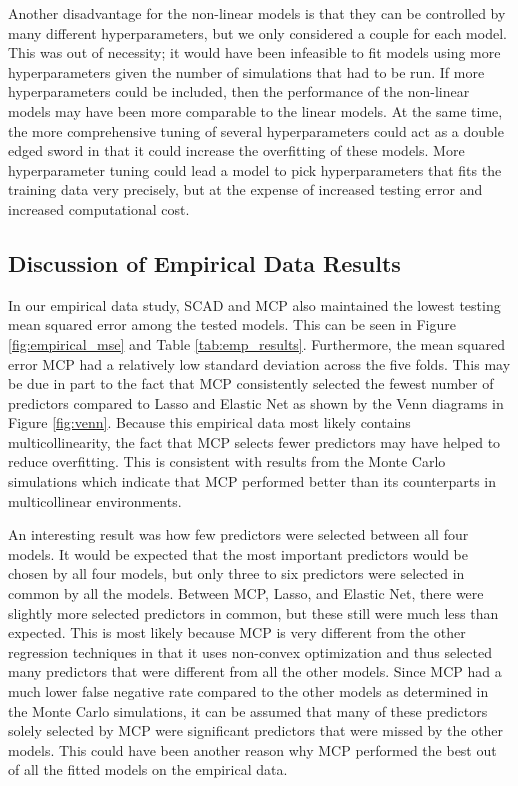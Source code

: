 \documentclass{article}
\begin{document}
Another disadvantage for the non-linear models is that they can be controlled by many different hyperparameters, but we only considered a couple for each model. This was out of necessity; it would have been infeasible to fit models using more hyperparameters given the number of simulations that had to be run. If more hyperparameters could be included, then the performance of the non-linear models may have been more comparable to the linear models. At the same time, the more comprehensive tuning of several hyperparameters could act as a double edged sword in that it could increase the overfitting of these models. More hyperparameter tuning could lead a model to pick hyperparameters that fits the training data very precisely, but at the expense of increased testing error and increased computational cost.

\subsection{Discussion of Empirical Data Results}
In our empirical data study, SCAD and MCP also maintained the lowest testing mean squared error among the tested models. This can be seen in Figure \ref{fig:empirical_mse} and Table \ref{tab:emp_results}. Furthermore, the mean squared error MCP had a relatively low standard deviation across the five folds. This may be due in part to the fact that MCP consistently selected the fewest number of predictors compared to Lasso and Elastic Net as shown by the Venn diagrams in Figure \ref{fig:venn}. Because this empirical data most likely contains multicollinearity, the fact that MCP selects fewer predictors may have helped to reduce overfitting. This is consistent with results from the Monte Carlo simulations which indicate that MCP performed better than its counterparts in multicollinear environments.

An interesting result was how few predictors were selected between all four models. It would be expected that the most important predictors would be chosen by all four models, but only three to six predictors were selected in common by all the models. Between MCP, Lasso, and Elastic Net, there were slightly more selected predictors in common, but these still were much less than expected. This is most likely because MCP is very different from the other regression techniques in that it uses non-convex optimization and thus selected many predictors that were different from all the other models. Since MCP had a much lower false negative rate compared to the other models as determined in the Monte Carlo simulations, it can be assumed that many of these predictors solely selected by MCP were significant predictors that were missed by the other models. This could have been another reason why MCP performed the best out of all the fitted models on the empirical data. 
\end{document}

